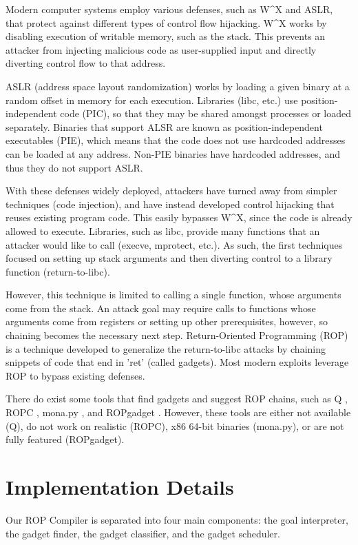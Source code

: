 \documentclass[journal]{IEEEtran}
\begin{document}
Modern computer systems employ various defenses, such as W\^{}X and ASLR, that
protect against different types of control flow hijacking. W\^{}X works by
disabling execution of writable memory, such as the stack. This prevents an
attacker from injecting malicious code as user-supplied input and directly
diverting control flow to that address.

ASLR (address space layout randomization) works by loading a given binary at a random offset in memory for
each execution. Libraries (libc, etc.) use position-independent code (PIC),
so that they may be shared amongst processes or loaded separately. Binaries that
support ALSR are known as position-independent executables (PIE), which means
that the code does not use hardcoded addresses can be loaded at any address.
Non-PIE binaries have hardcoded addresses, and thus they do not support ASLR.

With these defenses widely deployed, attackers have turned away from simpler
techniques (code injection), and have instead developed control hijacking that
reuses existing program code. This easily bypasses W\^{}X, since the code is
already allowed to execute. Libraries, such as libc, provide many functions that
an attacker would like to call (execve, mprotect, etc.). As such, the first
techniques focused on setting up stack arguments and then diverting control to a
library function (return-to-libc).

However, this technique is limited to calling a single function, whose arguments
come from the stack. An attack goal may require calls to functions whose
arguments come from registers or setting up other prerequisites, however, so
chaining becomes the necessary next step. Return-Oriented Programming (ROP) \cite{rop} is a
technique developed to generalize the return-to-libc attacks by chaining
snippets of code that end in 'ret' (called gadgets). Most modern exploits leverage ROP to bypass existing defenses.

There do exist some tools that find gadgets and suggest ROP chains, such as Q \cite{schwartz2011q},
ROPC \cite{ropc}, mona.py \cite{mona}, and ROPgadget \cite{ropgadget}. However, these tools are either not available (Q),
do not work on realistic (ROPC), x86 64-bit binaries (mona.py), or are not fully featured (ROPgadget).

\section{Implementation Details}
Our ROP Compiler is separated into four main components: the goal interpreter, the gadget finder, the gadget classifier, and the gadget scheduler.
\end{document}
